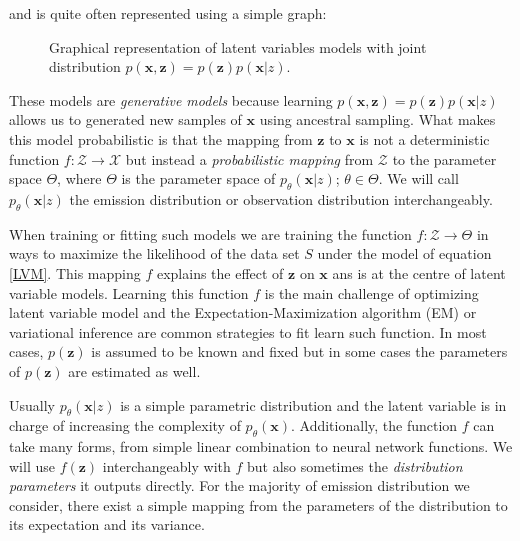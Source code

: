 \documentclass{article}
\newcommand{\x}{\mathbf{x}}
\newcommand{\z}{\mathbf{z}}
\begin{document}
and is quite often represented using a simple graph:
\begin{figure}[h!]
  \centering
  \caption{Graphical representation of latent variables models with joint distribution $p(\mathbf{x},\mathbf{z}) = p(\mathbf{z})p(\mathbf{x}|z)$.}
  \label{genny}
\end{figure}%
These models are \textit{generative models} because learning $p(\x,\z)= p(\z)p(\x|z)$ allows us to generated new samples of $\x$ using ancestral sampling. What makes this model probabilistic is that the mapping from $\z$
 to $\x$ is not a deterministic function $f: \mathcal{Z} \rightarrow \mathcal{X}$ but instead a \textit{probabilistic mapping} from $\mathcal{Z}$ to the parameter space $\Theta$, where $\Theta$ is the parameter space of $p_\theta(\x|z)$; $\theta \in \Theta$. We will call $p_\theta(\x|z)$ the emission distribution or observation distribution interchangeably.
 
\bigskip

When training or fitting such models we are training the function $f:\mathcal{Z} \rightarrow \Theta$ in ways to maximize the likelihood of the data set $S$ under the model of equation \ref{LVM}. This mapping $f$ explains the effect of $\z$ on $\x$ ans is at the centre of latent variable models. Learning this function $f$ is the main challenge of optimizing latent variable model and the Expectation-Maximization algorithm (EM) or variational inference are common strategies to fit learn such function. In most cases, $p(\z)$ is assumed to be known and fixed but in some cases the parameters of $p(\z)$ are estimated as well.

\bigskip

Usually $p_\theta(\x|z)$ is a simple parametric distribution and the latent variable is in charge of increasing the complexity of $p_\theta(\x)$. Additionally, the function $f$ can take many forms, from simple linear combination to neural network functions. We will use $f(\z)$ interchangeably with $f$ but also sometimes the \textit{distribution parameters} it outputs directly. For the majority of emission distribution we consider, there exist a simple mapping from the parameters of the distribution to its expectation and its variance.
\end{document}
